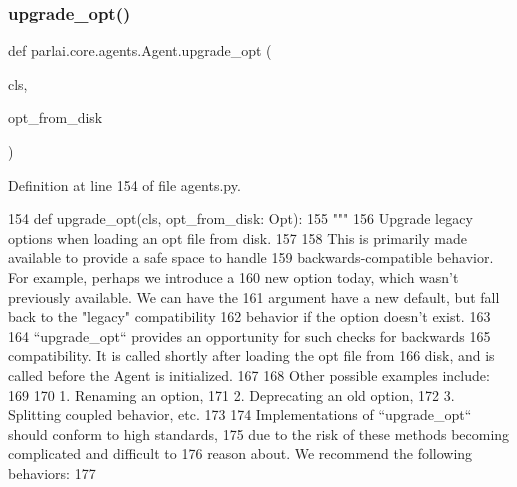 \subsubsection{\texorpdfstring{upgrade\+\_\+opt()}{upgrade\_opt()}}
{\footnotesize\ttfamily def parlai.\+core.\+agents.\+Agent.\+upgrade\+\_\+opt (\begin{DoxyParamCaption}\item[{}]{cls,  }\item[{}]{opt\+\_\+from\+\_\+disk }\end{DoxyParamCaption})}



Definition at line 154 of file agents.\+py.


\begin{DoxyCode}
154     \textcolor{keyword}{def }upgrade\_opt(cls, opt\_from\_disk: Opt):
155         \textcolor{stringliteral}{"""}
156 \textcolor{stringliteral}{        Upgrade legacy options when loading an opt file from disk.}
157 \textcolor{stringliteral}{}
158 \textcolor{stringliteral}{        This is primarily made available to provide a safe space to handle}
159 \textcolor{stringliteral}{        backwards-compatible behavior. For example, perhaps we introduce a}
160 \textcolor{stringliteral}{        new option today, which wasn't previously available. We can have the}
161 \textcolor{stringliteral}{        argument have a new default, but fall back to the "legacy" compatibility}
162 \textcolor{stringliteral}{        behavior if the option doesn't exist.}
163 \textcolor{stringliteral}{}
164 \textcolor{stringliteral}{        ``upgrade\_opt`` provides an opportunity for such checks for backwards}
165 \textcolor{stringliteral}{        compatibility. It is called shortly after loading the opt file from}
166 \textcolor{stringliteral}{        disk, and is called before the Agent is initialized.}
167 \textcolor{stringliteral}{}
168 \textcolor{stringliteral}{        Other possible examples include:}
169 \textcolor{stringliteral}{}
170 \textcolor{stringliteral}{            1. Renaming an option,}
171 \textcolor{stringliteral}{            2. Deprecating an old option,}
172 \textcolor{stringliteral}{            3. Splitting coupled behavior, etc.}
173 \textcolor{stringliteral}{}
174 \textcolor{stringliteral}{        Implementations of ``upgrade\_opt`` should conform to high standards,}
175 \textcolor{stringliteral}{        due to the risk of these methods becoming complicated and difficult to}
176 \textcolor{stringliteral}{        reason about. We recommend the following behaviors:}
177 \textcolor{stringliteral}{}

\end{DoxyCode}
